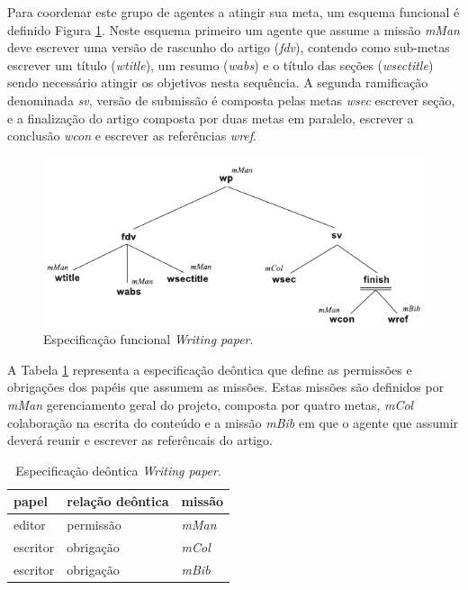 Para coordenar este grupo de agentes a atingir sua meta, um esquema funcional é definido Figura \ref{fig:writing-paper-funcional}. Neste esquema primeiro um agente que assume a missão \textit{mMan} deve escrever uma versão de rascunho do artigo (\textit{fdv}), contendo como sub-metas escrever um título (\textit{wtitle}), um resumo (\textit{wabs}) e o título das seções (\textit{wsectitle}) sendo necessário atingir os objetivos nesta sequência. A segunda ramificação denominada \textit{sv}, versão de submissão é composta pelas metas \textit{wsec} escrever seção, e a finalização do artigo composta por duas metas em paralelo, escrever a conclusão \textit{wcon} e escrever as referências \textit{wref}.
    
\begin{figure}[ht]
\centering
\includegraphics[scale=1.3]{imagens/5-writing-paper-funcional.pdf}
\caption{Especificação funcional \textit{Writing paper}. \cite{hubner2011normative}}
\label{fig:writing-paper-funcional}
\end{figure}

A Tabela \ref{tab:writing-paper-deontica} representa a especificação deôntica que define as permissões e obrigações dos papéis que assumem as missões. Estas missões são definidos por \textit{mMan} gerenciamento geral do projeto, composta por quatro metas, \textit{mCol} colaboração na escrita do conteúdo  e a missão \textit{mBib} em que o agente que assumir deverá reunir e escrever as referêncais do artigo.

\begin{table}[ht]
\centering
\caption{Especificação deôntica \textit{Writing paper}. \cite{hubner2011normative}}
\label{tab:writing-paper-deontica}
\begin{tabular}{@{}lll@{}}
\toprule
papel       & relação deôntica  & missão                        \\ \midrule
editor      & permissão         & \textit{mMan}                          \\
escritor    & obrigação         & \textit{mCol}                          \\
escritor    & obrigação         & \textit{mBib}                          \\
\bottomrule
\end{tabular}
\end{table}

